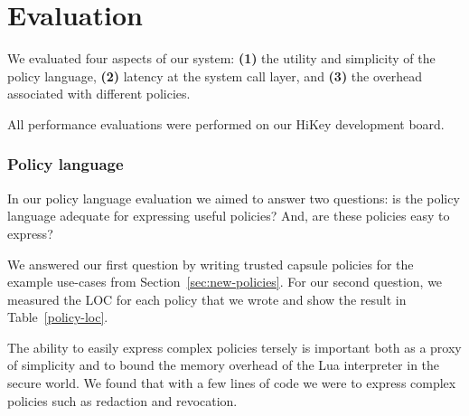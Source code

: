 \chapter{Evaluation}
\label{sec:eval}

We evaluated four aspects of our system: \textbf{(1)} the utility and
simplicity of the policy language, %
\textbf{(2)} latency at the system call layer,
and \textbf{(3)} the overhead associated with different policies. %

All performance evaluations were performed on our HiKey development board. 

 
\subsection{Policy language}

In our policy language evaluation we aimed to answer two questions: is
the policy language adequate for expressing useful policies? And, are
these policies easy to express?

We answered our first question by writing trusted capsule policies for
the example use-cases from Section~\ref{sec:new-policies}. For our second
question, we measured the LOC for each policy that we wrote and show
the result in Table~\ref{policy-loc}.

The ability to easily express complex policies tersely is important
both as a proxy of simplicity and to bound the memory overhead of the
Lua interpreter in the secure world. We found that with a few lines of
code we were to express complex policies such as redaction and
revocation.


